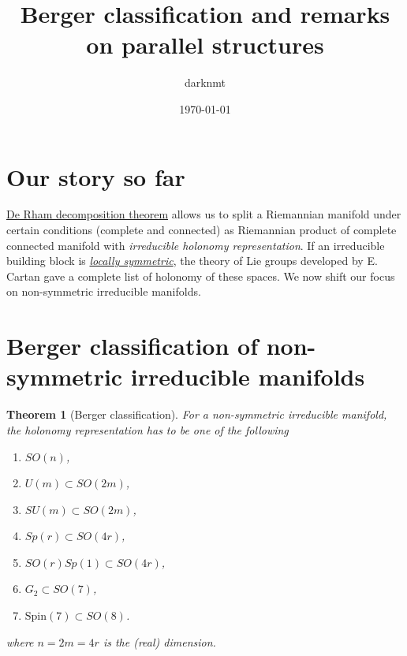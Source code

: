 \documentclass[11pt]{article}
\author{darknmt}
\date{\today}
\title{Berger classification and remarks on parallel structures}
\newtheorem{theorem}{Theorem}
\begin{document}
\maketitle
\tableofcontents

\section{Our story so far}
\label{sec:org5f81b1f}

\href{./de-rham-decomposition.org}{De Rham decomposition theorem} allows us to split a Riemannian manifold under certain conditions
(complete and connected) as Riemannian product of complete connected manifold with \emph{irreducible
holonomy representation}. If an irreducible building block is \href{./symmetric-space.org}{\emph{locally symmetric}}, the theory of Lie
groups developed by E. Cartan gave a complete list of holonomy of these spaces. We now shift our
focus on non-symmetric irreducible manifolds.


\section{Berger classification of non-symmetric irreducible manifolds}
\label{sec:orgf28312a}

\begin{theorem}[Berger classification]
\label{thm:Berger}
\label{org5e12bbd}
For a non-symmetric irreducible manifold, the holonomy representation has to be one of the
following
\begin{enumerate}
\item \(SO(n)\),
\item \(U(m)\subset SO(2m)\),
\item \(SU(m)\subset SO(2m)\),
\item \(Sp(r) \subset SO(4r)\),
\item \(SO(r)Sp(1) \subset SO(4r)\),
\item \(G_2\subset SO(7)\),
\item \(\text{Spin}(7)\subset SO(8)\).
\end{enumerate}
where \(n=2m=4r\) is the (real) dimension.
\end{theorem}
\end{document}
